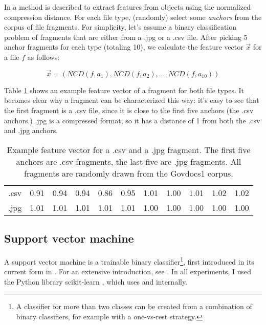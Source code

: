 In \cite{Cilibrasi2007} a method is described to extract features from
objects using the normalized compression distance. For each file type,
(randomly) select some \emph{anchors} from the corpus of file fragments.
For simplicity, let's assume a binary classification problem of fragments
that are either from a .jpg or a .csv file. After picking 5 anchor
fragments for each type (totaling 10), we calculate the feature vector $\vec{x}$ for a file $f$ as follows:

\begin{equation}\label{}
  \vec{x} = ( NCD(f, a_{1}), NCD(f, a_{2}), \dots, NCD(f, a_{10}) )
\end{equation}

Table \ref{table:feature_vectors} shows an example feature vector of
a fragment for both file types. It becomes clear why a fragment can be
characterized this way: it's easy to see that the first fragment is a .csv
file, since it is close to the first five anchors (the .csv anchors.) .jpg
is a compressed format, so it has a distance of 1 from both the .csv and
.jpg anchors.

\begin{table}
\begin{tabular}{lrrrrrrrrrr}
\hline
 .csv & 0.91 & 0.94 & 0.94 & 0.86 & 0.95 & 1.01 & 1.00 & 1.01 & 1.02 & 1.02 \\
 .jpg & 1.01 & 1.01 & 1.01 & 1.01 & 1.01 & 1.00 & 1.00 & 1.00 & 1.00 & 1.00 \\
\hline
\end{tabular} \caption{Example feature vector for a .csv and a .jpg
fragment. The first five anchors are .csv fragments, the last five are
.jpg fragments. All fragments are randomly drawn from the Govdocs1
corpus.} \label{table:feature_vectors} \end{table}

\subsection{Support vector machine}

A support vector machine is a trainable binary classifier\footnote{A
classifier for more than two classes can be created from a combination of
binary classifiers, for example with a one-vs-rest strategy.}, first introduced in its current form in
\cite{Cortes1995}. For an extensive introduction, see \cite{Burges1998}.
In all experiments, I used the Python library scikit-learn
\cite{Pedregosa2011}, which uses \cite{Fan2014} and \cite{Chang2011}
internally.

